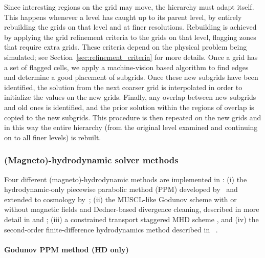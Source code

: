 Since interesting regions on the grid may move, the hierarchy must
adapt itself. This happens whenever a level has caught up to its
parent level, by entirely rebuilding the grids on that level and at
finer resolutions. Rebuilding is achieved by applying the grid
refinement criteria to the grids on that level, flagging zones that
require extra grids.  These criteria depend on the physical problem
being simulated; see Section~\ref{sec:refinement_criteria} for more
details.  Once a grid has a set of flagged cells, we apply a
machine-vision based algorithm \citep{Berger91} to find edges and
determine a good placement of subgrids.
Once these new subgrids have been identified, the solution from the
next coarser grid is interpolated in order to initialize the values on
the new grids.  Finally, any overlap between new subgrids and old ones
is identified, and the prior solution within the regions of overlap is
copied to the new subgrids. This procedure is then repeated on the new
grids and in this way the entire hierarchy (from the original level
examined and continuing on to all finer levels) is rebuilt.

\subsubsection{(Magneto)-hydrodynamic solver methods}

Four different (magneto)-hydrodynamic methods are implemented in
\enzo: (i) the hydrodynamic-only piecewise parabolic method (PPM)
developed by~\citet{1984JCoPh..54..174C} and extended to cosmology
by~\citet{1995CoPhC..89..149B}; (ii) the MUSCL-like Godunov scheme
\citep{1977JCoPh..23..276V} with or without magnetic fields and Dedner-based
divergence cleaning, described in more detail in
\citet{WangAbelZhang08} and \citet{WangAbel09}; (iii) a constrained
transport staggered MHD scheme \citep{Collins10}, and (iv) the
second-order finite-difference hydrodynamics method described in
\zeus~\citep{Stone92a,Stone92b}.

\paragraph{Godunov PPM method (HD only)}

